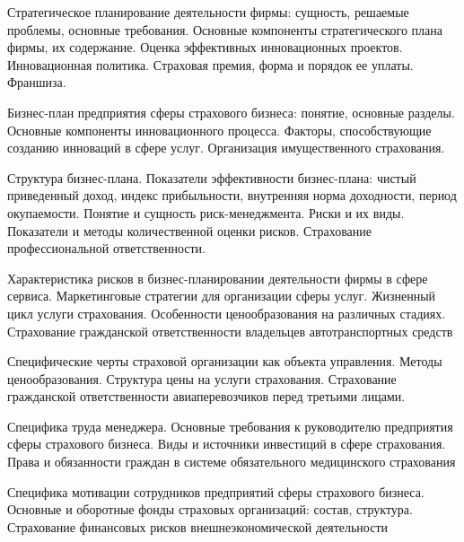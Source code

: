 \documentclass[
	11pt,
	a4paper,
	]
	{article}
\begin{document}
\bigskip

\noindent{} 
	{
		Стратегическое планирование деятельности фирмы: сущность, решаемые проблемы, основные требования. Основные компоненты стратегического плана фирмы, их содержание.
	}{
		Оценка эффективных инновационных проектов. Инновационная политика.
	}{
		Страховая премия, форма и порядок ее уплаты. Франшиза.
	}

\bigskip

\noindent{} 
	{
		Бизнес-план предприятия сферы страхового бизнеса: понятие, основные разделы.
	}{
		Основные компоненты инновационного процесса. Факторы, способствующие созданию инноваций в сфере услуг.
	}{
		Организация имущественного страхования.
	}

\bigskip

\noindent{} 
	{
		Структура бизнес-плана. Показатели эффективности бизнес-плана: чистый приведенный доход, индекс прибыльности, внутренняя норма доходности, период окупаемости.
	}{
		Понятие и сущность риск-менеджмента. Риски и их виды. Показатели и методы количественной оценки рисков.
	}{
		Страхование профессиональной ответственности.
	}

\bigskip

\noindent{} 
	{
		Характеристика рисков в бизнес-планировании деятельности фирмы в сфере сервиса.
	}{
		Маркетинговые стратегии для организации сферы услуг. Жизненный цикл услуги страхования. Особенности ценообразования на различных стадиях.
	}{
		Страхование гражданской ответственности владельцев автотранспортных средств
	}

\bigskip

\noindent{} 
	{
		Специфические черты страховой организации как объекта управления.
	}{
		Методы ценообразования. Структура цены на услуги страхования.
	}{
		Страхование гражданской ответственности авиаперевозчиков перед третьими лицами.
	}

\bigskip

\noindent{} 
	{
		Специфика труда менеджера. Основные требования к руководителю предприятия сферы страхового бизнеса.
	}{
		Виды и источники инвестиций в сфере страхования.
	}{
		Права и обязанности граждан в системе обязательного медицинского страхования
	}

\bigskip

\noindent{} 
	{
		Специфика мотивации сотрудников предприятий сферы страхового бизнеса.
	}{
		Основные и оборотные фонды страховых организаций: состав, структура.
	}{
		Страхование финансовых рисков внешнеэкономической деятельности
	}
\end{document}
